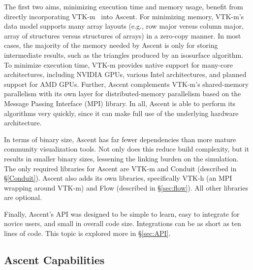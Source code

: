 \documentclass[graybox]{svmult}
\newcommand{\fix}[1]{\textcolor{red}{#1}} %
\begin{document}
The first two aims, minimizing execution time and memory usage, benefit from directly
incorporating VTK-m~\cite{Moreland:CGA2016} into Ascent.
%
For minimizing memory,
VTK-m's data model supports many array layouts (e.g., row major versus
column major, array of structures versus structures of arrays)
in a zero-copy manner.
%
In most cases, the majority of the memory needed by Ascent is only for
storing intermediate results, such as the triangles produced by an isosurface algorithm.
%
To minimize execution time,
VTK-m provides native support for many-core architectures,
including NVIDIA GPUs, various Intel architectures,
and planned support for AMD GPUs.
%
Further, Ascent complements VTK-m's shared-memory parallelism with
its own layer for distributed-memory parallelism based on the
Message Passing Interface (MPI) library.
%
In all, Ascent is able to perform its algorithms very quickly,
since it can make full use of the underlying hardware architecture.
%

In terms of binary size, Ascent has far
fewer dependencies than more mature community visualization tools.
%
Not only does this reduce build complexity, but it results in
smaller binary sizes, lessening the linking burden on the simulation.
%
The only required libraries for Ascent are VTK-m
and Conduit (described in \S\ref{Conduit}).
%
Ascent also adds its own libraries, specifically VTK-h (an MPI wrapping around
VTK-m) and Flow (described in \S\ref{sec:flow}).
%
All other libraries are optional.

Finally, Ascent's API was designed to be simple to learn,
easy to integrate for novice users, and small in overall code size.
%
Integrations can be as short as ten lines of code.
%
This topic is explored more in \S\ref{sec:API}.

\subsection{Ascent Capabilities}
\label{subsec:capabilities}
\end{document}
